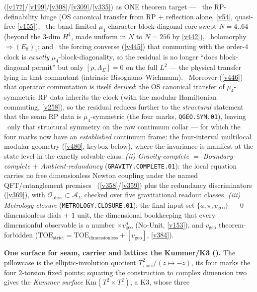 \documentclass[11pt,a4paper]{article}
\begin{document}
\begin{keybox}
(\vref{v177}/\vref{v199}/\vref{v308}/\vref{v309}/\vref{v335}) as ONE theorem target --- \mE\ the RP-definability
hinge (OS canonical transfer from RP $+$ reflection alone, \vref{v54}, quasi-free \vref{v155}), \mE\ the band-limited
$\mu_4$-character-block-diagonal core swept $N{=}4..64$ (beyond the $3$-dim $H^1$, made uniform in $N$ to $N{=}256$
by \vref{v442}), \mE\ holomorphy $\Rightarrow(E_8)_1$; and \mE\ the forcing converse (\vref{v445}) that commuting with
the order-$4$ clock is \emph{exactly} $\mu_4$-block-diagonality, so the residual is no longer ``does block-diagonal
permit'' but only $[\rho,\Lambda_\Sigma]{=}0$ on the full $L^2$ --- the physical transfer lying in that
commutant (intrinsic Bisognano--Wichmann). \mE\ Moreover (\vref{v446}) that operator commutation is itself
\emph{derived}: the OS canonical transfer of $\mu_4$-symmetric RP data inherits the clock (with the modular
Hamiltonian commuting, \vref{v258}), so the residual reduces further to the \emph{structural} statement that the
seam RP data is $\mu_4$-symmetric (the four marks, \texttt{QGEO.SYM.01}), leaving \mO\ only that structural
symmetry on the raw continuum collar --- for which the four marks now have an \emph{established} continuum frame:
the four-interval multilocal modular geometry (\vref{v480}, keybox below), where the invariance is manifest at the
state level in the exactly solvable class.
\emph{(ii) Gravity-complete $=$ Boundary-complete $+$ Ambient-redundancy} (\texttt{GRAVITY.COMPLETE.01}): the local
equation carries no free dimensionless Newton coupling under the named QFT/entanglement premises \mC\ (\vref{v358}/\vref{v359}) plus the redundancy discriminators (\vref{v369}), with
$\mathcal O_{\mathrm{phys}}\subset\mathcal A_\Sigma$ checked over five gravitational readout classes.
\emph{(iii) Metrology closure} (\texttt{METROLOGY.CLOSURE.01}): the final input set $\{a,\pi,v_{\mathrm{geo}}\}$ ---
$0$ dimensionless dials $+$ $1$ unit, the dimensional bookkeeping that every dimensionful observable is a number
$\times v_{\mathrm{geo}}^d$ (No-Unit, \vref{v153}), and $v_{\mathrm{geo}}$ theorem-forbidden
($\mathrm{TOE}_{\mathrm{strict}}{=}\mathrm{TOE}_{\mathrm{dimensionless}}{+}[v_{\mathrm{geo}}]$, \vref{v384}).
\par\smallskip\noindent\textbf{One surface for seam, carrier and lattice: the Kummer/K3
().} The pillowcase is the elliptic-involution quotient
$T^2_{\tau=i}/(z{\mapsto}{-}z)$, its four marks the four $2$-torsion fixed points; squaring the construction
to complex dimension two gives the \emph{Kummer surface} $\mathrm{Km}(T^2{\times}T^2)$, a K3, whose three

\end{keybox}
\end{document}
